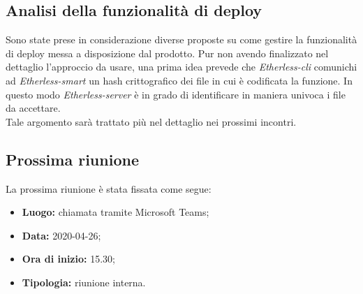 	\subsection{Analisi della funzionalità di deploy}
	Sono state prese in considerazione diverse proposte su come gestire la funzionalità di deploy messa a disposizione dal prodotto. Pur non avendo finalizzato nel dettaglio l'approccio da usare, una prima idea prevede che  \textit{Etherless-cli} comunichi ad \textit{Etherless-smart} un hash crittografico dei file in cui è codificata la funzione. In questo modo \textit{Etherless-server} è in grado di identificare in maniera univoca i file da accettare. \\
	Tale argomento sarà trattato più nel dettaglio nei prossimi incontri. 
	
	\subsection{Prossima riunione}
		La prossima riunione è stata fissata come segue:
		\begin{itemize}
			\item \textbf{Luogo: } chiamata tramite Microsoft Teams; 
			\item \textbf{Data: } 2020-04-26;
			\item \textbf{Ora di inizio: } 15.30;
			\item \textbf{Tipologia: } riunione interna.
		\end{itemize}
